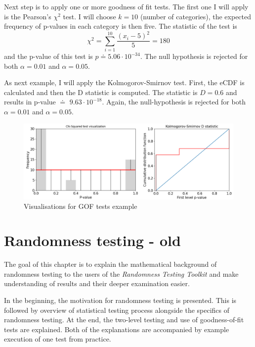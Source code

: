 \documentclass[
  digital,     %
  oneside,     %
  nosansbold,  %
  nocolorbold, %
  nolof,         %
  nolot,         %
]{fithesis4}
\begin{document}
Next step is to apply one or more goodness of fit tests. The first one I will apply is the Pearson's $\chi^2$ test. I will choose $k=10$ (number of categories), the expected frequency of p-values in each category is then five. The statistic of the test is
\[\chi^2 = \sum_{i=1}^{10} \dfrac{(x_i - 5)^2}{5} = 180 \]
and the p-value of this test is $p\doteq5.06\cdot10^{-34}$. The null hypothesis is rejected for both $\alpha = 0.01$ and $\alpha = 0.05$. 

As next example, I will apply the Kolmogorov-Smirnov test. First, the eCDF is calculated and then the D statistic is computed. The statistic is $D = 0.6$ and results in p-value $\doteq$ $9.63\cdot10^{-18}$. Again, the null-hypothesis is rejected for both $\alpha = 0.01$ and $\alpha = 0.05$. 


\begin{figure}
  \begin{center}
    \includegraphics[width=13cm]{figures/two_example.png}
  \end{center}
  \caption{Visualisations for GOF tests example}
  \label{fig:two_example}
\end{figure}


\chapter{Randomness testing - old}

The goal of this chapter is to explain the mathematical background of randomness testing to the users of the \emph{Randomness Testing Toolkit} and make understanding of results and their deeper examination easier.

In the beginning, the motivation for randomness testing is presented. This is followed by overview of statistical testing process alongside the specifics of randomness testing. At the end, the two-level testing and use of goodness-of-fit tests are explained. Both of the explanations are accompanied by example execution of one test from practice. 
\end{document}
